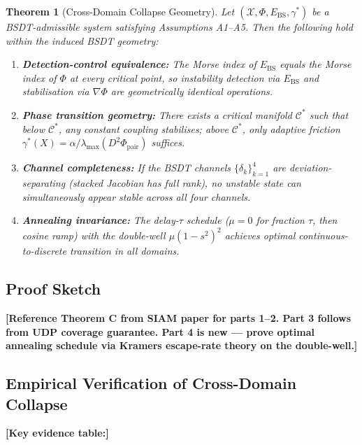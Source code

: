\documentclass[11pt,a4paper]{article}
\newcommand{\Ebs}{E_{\mathrm{BS}}}
\newcommand{\Cman}{\mathcal{C}^*}
\newcommand{\grad}{\nabla}
\newtheorem{theorem}{Theorem}
\begin{document}
\begin{theorem}[Cross-Domain Collapse Geometry]\label{thm:universal}
Let $(\mathcal{X}, \Phi, \Ebs, \gamma^*)$ be a BSDT-admissible system
satisfying Assumptions A1--A5.  Then the following hold \emph{within
the induced BSDT geometry}:
\begin{enumerate}[nosep]
  \item \textbf{Detection-control equivalence:} The Morse index of $\Ebs$
        equals the Morse index of $\Phi$ at every critical point, so
        instability detection \emph{via} $\Ebs$ and stabilisation \emph{via}
        $\grad\Phi$ are geometrically identical operations.
  \item \textbf{Phase transition geometry:} There exists a critical
        manifold $\Cman$ such that below $\Cman$, any constant coupling
        stabilises; above $\Cman$, only adaptive friction
        $\gamma^*(X) = \alpha / \lambda_{\max}(D^2\Phi_{\mathrm{pair}})$
        suffices.
  \item \textbf{Channel completeness:} If the BSDT channels
        $\{\delta_k\}_{k=1}^4$ are deviation-separating (stacked Jacobian
        has full rank), no unstable state can simultaneously appear stable
        across all four channels.
  \item \textbf{Annealing invariance:} The delay-$\tau$ schedule
        ($\mu = 0$ for fraction $\tau$, then cosine ramp) with the
        double-well $\mu(1-s^2)^2$ achieves optimal continuous-to-discrete
        transition in all domains.
\end{enumerate}
\end{theorem}

\subsection{Proof Sketch}
\textbf{[Reference Theorem C from SIAM paper for parts 1--2.
Part 3 follows from UDP coverage guarantee. Part 4 is new —
prove optimal annealing schedule via Kramers escape-rate theory
on the double-well.]}

\subsection{Empirical Verification of Cross-Domain Collapse}

\textbf{[Key evidence table:]}
\end{document}

